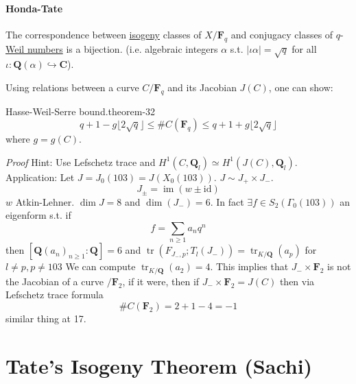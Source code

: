 \documentclass[10pt,]{book}
\makeatletter
\renewcommand*{\proofname}{Proof}
\renewenvironment{proof}[1][\proofname]{\par
  \pushQED{\qed}%
  \normalfont \topsep6\p@\@plus6\p@\relax
  \trivlist
  \item\relax
    {\itshape
    #1\@addpunct{.}}\hspace\labelsep\ignorespaces
}{%
  \popQED\endtrivlist\@endpefalse
}
\numberwithin{equation}{section}
\newcommand{\lb}{[}
\newcommand{\rb}{]}
\newcommand{\QQ}{\mathbf{Q}}
\newcommand{\CC}{\mathbf{C}}
\newcommand{\FF}{\mathbf{F}}
\newcommand{\id}{\mathrm{id}}
\DeclareMathOperator{\im}{im}
\DeclareMathOperator{\tr}{tr}
\makeatother
\begin{document}
\paragraph[{Honda-Tate}]{Honda-Tate}\hypertarget{paragraphs-6}{}
\hypertarget{p-371}{}%
The correspondence between \hyperref[def-supersing-isog-isog]{isogeny} classes of \(X/\FF_q\) and conjugacy classes of \(q\)-\hyperref[sec-honda-tate]{Weil numbers} is a bijection. (i.e. algebraic integers \(\alpha\) s.t. \(|\iota \alpha| = \sqrt q\) for all \(\iota \colon \QQ(\alpha) \hookrightarrow \CC\)).%
\par
\hypertarget{p-372}{}%
Using relations between a curve \(C/\FF_q\) and its Jacobian \(J(C) \), one can show:%
\begin{theorem}{Hasse-Weil-Serre bound.}{}{theorem-32}%
\hypertarget{p-373}{}%
%
\begin{equation*}
q + 1 - g\lfloor 2\sqrt q\rfloor \le \#C(\FF_{q}) \le q + 1 + g\lfloor 2\sqrt q\rfloor
\end{equation*}
where \(g=  g(C)\).%
\end{theorem}
\begin{proof}\hypertarget{proof-63}{}
\hypertarget{p-374}{}%
Hint: Use Lefschetz trace and \(H^1(C, \QQ_l) \simeq H^1(J(C) , \QQ_l)\).%
\end{proof}
\hypertarget{p-375}{}%
Application: Let \(J = J_0(103) = J(X_0(103))\). \(J\sim J_+ \times J_-\).%
\begin{equation*}
J_{\pm} = \im(w \pm \id)
\end{equation*}
\(w\) Atkin-Lehner. \(\dim J = 8\) and \(\dim(J_-) = 6\). In fact \(\exists f\in  S_2( \Gamma_0(103))\) an eigenform s.t. if%
\begin{equation*}
f=\sum_{n\ge 1} a_n q^n
\end{equation*}
then \(\lb \QQ(a_n)_{n \ge 1}: \QQ\rb =6\) and \(\tr( F_{J_-,p};  T_l(J_-)) = \tr_{K/\QQ}(a_p)\)  for \(l \ne p, p\ne 103\) We can compute \(\tr_{K/\QQ} ( a_2) = 4\). This implies that \(J_- \times \FF_2\) is not the Jacobian of a curve \(/\FF_2\), if it were, then  if \(J_- \times \FF_2 = J(C)\) then via Lefschetz trace formula%
\begin{equation*}
\#C(\FF_2) = 2+1 - 4 = -1
\end{equation*}
similar thing at 17.%
%
%
\typeout{************************************************}
\typeout{************************************************}
%
\section[{Tate's Isogeny Theorem (Sachi)}]{Tate's Isogeny Theorem (Sachi)}\label{sec-tate-thm}
%
%
\typeout{************************************************}
\typeout{************************************************}
%
\end{document}
